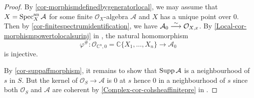 \begin{proof}
By \cref{cor-morphismdefinedbygeneratorlocal}, we may assume that $X=\operatorname{Spec}^{\mathrm{an}}_X \mathcal{A}$ for some finite $\mathcal{O}_X$-algebra $\mathcal{A}$ and $X$ has a unique point over $0$. Then by \cref{cor-finitespectrumidentification}, we have $\mathcal{A}_0\stackrel{\sim}{\longrightarrow} \mathcal{O}_{X,x}$. By \cref{Local-cor-morphismpowertolocalsurinj} in , the natural homomorphism
\[
    \varphi^{\#}:\mathcal{O}_{\mathbb{C}^n,0}=\mathbb{C}\{X_1,\ldots,X_n\}\rightarrow \mathcal{A}_0
\]
is injective. 

By \cref{cor-suppaffmorphism}, it remains to show that $\operatorname{Supp} \mathcal{A}$ is a neighbourhood of $s$ in $S$. But the kernel of $\mathcal{O}_S\rightarrow \mathcal{A}$ is $0$ at $s$ hence $0$ in a neighbourhood of $s$ since both $\mathcal{O}_S$ and $\mathcal{A}$ are coherent by \cref{Complex-cor-cohsheaffinitepre} in .
\end{proof}


